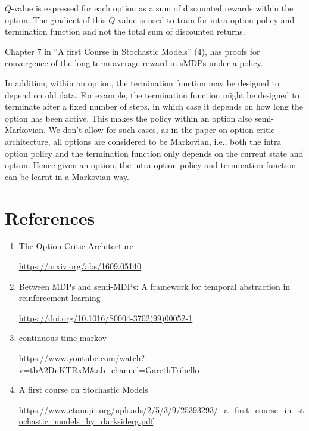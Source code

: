 \( Q \)-value is expressed for each option as a sum of discounted rewards within the option.
The gradient of this \( Q \)-value is used to train for intra-option policy and termination function and not the total sum of discounted returns.

Chapter 7 in ``A first Course in Stochastic Models'' (4), has proofs for convergence of the long-term average reward in sMDPs under a policy.

In addition, within an option, the termination function may be designed to depend on old data.
For example, the termination function might be designed to terminate after a fixed number of steps, in which case it depends on how long the option has been active.
This makes the policy within an option also semi-Markovian.
We don't allow for such cases, as in the paper on option critic architecture, all options are considered to be Markovian, i.e., both the intra option policy and the termination function only depends on the current state and option.
Hence given an option, the intra option policy and termination function can be learnt in a Markovian way.


\section{References}

\begin{enumerate}
    \item The Option Critic Architecture

          \url{https://arxiv.org/abs/1609.05140}


    \item Between MDPs and semi-MDPs: A framework for temporal abstraction in reinforcement learning

          \url{https://doi.org/10.1016/S0004-3702(99)00052-1}


    \item continuous time markov

          \url{https://www.youtube.com/watch?v=tbA2DnKTRxM&ab_channel=GarethTribello}


    \item A first course on Stochastic Models

          \url{https://www.ctanujit.org/uploads/2/5/3/9/25393293/_a_first_course_in_stochastic_models_by_darksiderg.pdf}

\end{enumerate}
